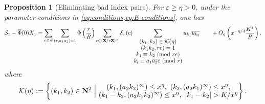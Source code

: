 \documentclass[reqno,11pt]{amsart}
\newtheorem{proposition}[theorem]{Proposition}
\theoremstyle{definition}
\theoremstyle{remark}
\numberwithin{equation}{section}
\newcommand{\Z}{\mathbf{Z}}
\newcommand{\N}{\mathbf{N}}
\newcommand{\msE}{\mathscr{E}}
\newcommand{\mE}{\mathcal{E}}
\newcommand{\mS}{\mathcal{S}}
\newcommand{\mK}{\mathcal{K}}
\newcommand{\eps}{\varepsilon}
\renewcommand{\bar}{\overline}
\renewcommand{\hat}{\widehat}
\renewcommand{\pmod}[1]{\ (\textnormal{mod } #1)}
\newcommand{\twolinemath}[2]{\let\scriptstyle\textstyle \substack{{#1} \\ {#2}}}
\begin{document}
\begin{proposition}[Eliminating bad index pairs] \label{prop:bad-pairs}
For $\eps \ge \eta > 0$, under the parameter conditions in \cref{eq:conditions,eq:E-conditions}, one has
\[
\begin{aligned}
    \mS_1 - \hat{\Phi}(0) X_1 
    =
    \sum_{e \in \msE} \sum_{(r,a_1a_2)=1} \Phi\left(\frac{r}{R}\right) \sum_{c \in (\Z/r\Z)^\times} \mE_r(c) \sum_{\substack{(k_1, k_2) \in \mK(\eta) \\ (k_1k_2, re) = 1 \\ k_1 \equiv k_2 \pmod{re} \\ k_i \equiv a_1 \bar{a_2 c} \pmod{r}}} u_{k_1} \bar{u_{k_2}} 
    \qquad
    +
    O_\eta\left(x^{-\eta/4} \frac{K^2}{R} \right),
\end{aligned}
\]
where
\begin{equation} \label{eq:bad-pairs}
    \mK(\eta) := \left\{ 
    (k_1, k_2) \in \N^2\  \Big\vert\  
    \twolinemath{(k_1, (a_2k_2)^\infty) \le x^\eta,\ (k_2, (a_2k_1)^\infty) \le x^\eta,}
    {
    (k_1 - k_2, (a_2k_1k_2)^\infty) \le x^\eta,\ |k_1 - k_2| > K/x^\eta
    }
    \right\}.
\end{equation}
\end{proposition}
\end{document}
